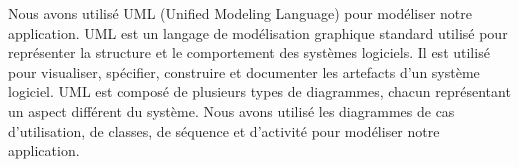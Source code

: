Nous avons utilisé UML (Unified Modeling Language) pour modéliser notre
application. UML est un langage de modélisation graphique standard utilisé pour
représenter la structure et le comportement des systèmes logiciels. Il est
utilisé pour visualiser, spécifier, construire et documenter les artefacts d'un
système logiciel. UML est composé de plusieurs types de diagrammes, chacun
représentant un aspect différent du système. Nous avons utilisé les diagrammes
de cas d'utilisation, de classes, de séquence et d'activité pour modéliser
notre application.